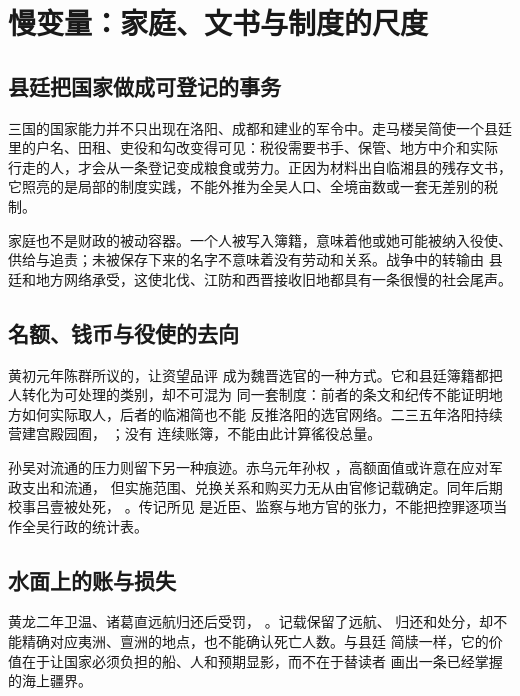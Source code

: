 \section{慢变量：家庭、文书与制度的尺度}
\label{sec:society-material}

\subsection{县廷把国家做成可登记的事务}

三国的国家能力并不只出现在洛阳、成都和建业的军令中。走马楼吴简使一个县廷
里的户名、田租、吏役和勾改变得可见：税役需要书手、保管、地方中介和实际
行走的人，才会从一条登记变成粮食或劳力。正因为材料出自临湘县的残存文书，
它照亮的是局部的制度实践，不能外推为全吴人口、全境亩数或一套无差别的税制。

家庭也不是财政的被动容器。一个人被写入簿籍，意味着他或她可能被纳入役使、
供给与追责；未被保存下来的名字不意味着没有劳动和关系。战争中的转输由
县廷和地方网络承受，这使北伐、江防和西晋接收旧地都具有一条很慢的社会尾声。

\subsection{名额、钱币与役使的去向}

黄初元年陈群所议的，让资望品评
成为魏晋选官的一种方式。它和县廷簿籍都把人转化为可处理的类别，却不可混为
同一套制度：前者的条文和纪传不能证明地方如何实际取人，后者的临湘简也不能
反推洛阳的选官网络。二三五年洛阳持续营建宫殿园囿，
；没有
连续账簿，不能由此计算徭役总量。

孙吴对流通的压力则留下另一种痕迹。赤乌元年孙权
，高额面值或许意在应对军政支出和流通，
但实施范围、兑换关系和购买力无从由官修记载确定。同年后期校事吕壹被处死，
。传记所见
是近臣、监察与地方官的张力，不能把控罪逐项当作全吴行政的统计表。

\subsection{水面上的账与损失}

黄龙二年卫温、诸葛直远航归还后受罚，
。记载保留了远航、
归还和处分，却不能精确对应夷洲、亶洲的地点，也不能确认死亡人数。与县廷
简牍一样，它的价值在于让国家必须负担的船、人和预期显影，而不在于替读者
画出一条已经掌握的海上疆界。

